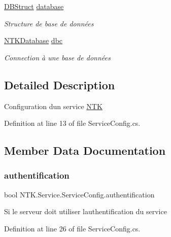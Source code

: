 \begin{DoxyCompactItemize}
\mbox{\hyperlink{class_n_t_k_1_1_database_1_1_d_b_struct}{D\+B\+Struct}} \mbox{\hyperlink{struct_n_t_k_1_1_service_1_1_service_config_a13621d76e8b256edac82936786ca7337}{database}}
\begin{DoxyCompactList}\small\item\em Structure de base de données \end{DoxyCompactList}\item 
\mbox{\hyperlink{class_n_t_k_1_1_database_1_1_n_t_k_database}{N\+T\+K\+Database}} \mbox{\hyperlink{struct_n_t_k_1_1_service_1_1_service_config_a2eb2fa5bdb7b4cadb62494a153149bc1}{dbc}}
\begin{DoxyCompactList}\small\item\em Connection à une base de données \end{DoxyCompactList}\end{DoxyCompactItemize}


\subsection{Detailed Description}
Configuration d\textquotesingle{}un service \mbox{\hyperlink{namespace_n_t_k}{N\+TK}} 



Definition at line 13 of file Service\+Config.\+cs.



\subsection{Member Data Documentation}
\mbox{\label{struct_n_t_k_1_1_service_1_1_service_config_a4badab1fe4287d9dfdadf4f037bdd9e5}} 
\subsubsection{\texorpdfstring{authentification}{authentification}}
{\footnotesize\ttfamily bool N\+T\+K.\+Service.\+Service\+Config.\+authentification}



Si le serveur doit utiliser l\textquotesingle{}authentification du service 



Definition at line 26 of file Service\+Config.\+cs.

